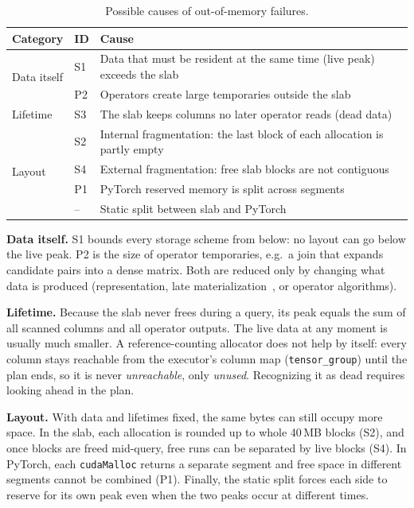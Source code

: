\documentclass[10pt,twocolumn,letterpaper]{article}
\newcommand{\code}[1]{\texttt{\small #1}}
\begin{document}
\begin{table}[t]
\centering\small
\setlength{\tabcolsep}{3pt}
\begin{tabular}{@{}llp{5.1cm}@{}}
\toprule
Category & ID & Cause \\
\midrule
\multirow{2}{*}{Data itself} & S1 & Data that must be resident at the same time (live peak) exceeds the slab \\
 & P2 & Operators create large temporaries outside the slab \\
\midrule
Lifetime & S3 & The slab keeps columns no later operator reads (dead data) \\
\midrule
\multirow{4}{*}{Layout} & S2 & Internal fragmentation: the last block of each allocation is partly empty \\
 & S4 & External fragmentation: free slab blocks are not contiguous \\
 & P1 & PyTorch reserved memory is split across segments \\
 & -- & Static split between slab and PyTorch \\
\bottomrule
\end{tabular}
\caption{Possible causes of out-of-memory failures.}
\label{tab:causes}
\end{table}

\textbf{Data itself.} S1 bounds every storage scheme from below: no layout can go below
the live peak. P2 is the size of operator temporaries, e.g.\ a join that expands
candidate pairs into a dense matrix. Both are reduced only by changing what data is
produced (representation, late materialization~\cite{abadi2007materialization}, or
operator algorithms).

\textbf{Lifetime.} Because the slab never frees during a query, its peak equals the sum
of all scanned columns and all operator outputs. The live data at any moment is
usually much smaller. A reference-counting allocator does not help by itself: every
column stays reachable from the executor's column map (\code{tensor\_group}) until the
plan ends, so it is never \emph{unreachable}, only \emph{unused}. Recognizing it as dead
requires looking ahead in the plan.

\textbf{Layout.} With data and lifetimes fixed, the same bytes can still occupy more
space. In the slab, each allocation is rounded up to whole 40\,MB blocks (S2), and once
blocks are freed mid-query, free runs can be separated by live blocks (S4). In PyTorch,
each \code{cudaMalloc} returns a separate segment and free space in different segments
cannot be combined (P1). Finally, the static split forces each side to reserve for its
own peak even when the two peaks occur at different times.
\end{document}
